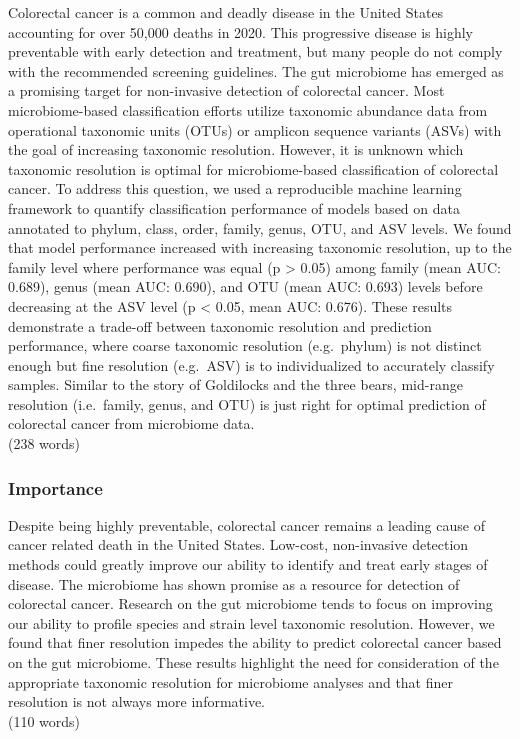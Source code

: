 \documentclass[
]{article}
\begin{document}
Colorectal cancer is a common and deadly disease in the United States
accounting for over 50,000 deaths in 2020. This progressive disease is
highly preventable with early detection and treatment, but many people
do not comply with the recommended screening guidelines. The gut
microbiome has emerged as a promising target for non-invasive detection
of colorectal cancer. Most microbiome-based classification efforts
utilize taxonomic abundance data from operational taxonomic units (OTUs)
or amplicon sequence variants (ASVs) with the goal of increasing
taxonomic resolution. However, it is unknown which taxonomic resolution
is optimal for microbiome-based classification of colorectal cancer. To
address this question, we used a reproducible machine learning framework
to quantify classification performance of models based on data annotated
to phylum, class, order, family, genus, OTU, and ASV levels. We found
that model performance increased with increasing taxonomic resolution,
up to the family level where performance was equal (p \textgreater{}
0.05) among family (mean AUC: 0.689), genus (mean AUC: 0.690), and OTU
(mean AUC: 0.693) levels before decreasing at the ASV level (p
\textless{} 0.05, mean AUC: 0.676). These results demonstrate a
trade-off between taxonomic resolution and prediction performance, where
coarse taxonomic resolution (e.g.~phylum) is not distinct enough but
fine resolution (e.g.~ASV) is to individualized to accurately classify
samples. Similar to the story of Goldilocks and the three bears,
mid-range resolution (i.e.~family, genus, and OTU) is just right for
optimal prediction of colorectal cancer from microbiome data.\\
(238 words)

\hypertarget{importance}{%
\subsubsection{Importance}\label{importance}}

Despite being highly preventable, colorectal cancer remains a leading
cause of cancer related death in the United States. Low-cost,
non-invasive detection methods could greatly improve our ability to
identify and treat early stages of disease. The microbiome has shown
promise as a resource for detection of colorectal cancer. Research on
the gut microbiome tends to focus on improving our ability to profile
species and strain level taxonomic resolution. However, we found that
finer resolution impedes the ability to predict colorectal cancer based
on the gut microbiome. These results highlight the need for
consideration of the appropriate taxonomic resolution for microbiome
analyses and that finer resolution is not always more informative.\\
(110 words)
\end{document}
